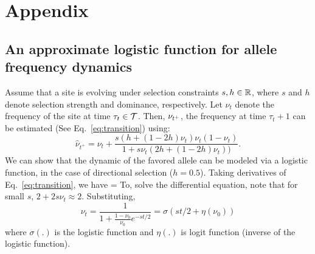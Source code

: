 
\clearpage
\setcounter{figure}{0}
\setcounter{table}{0}
\setcounter{equation}{0}
\renewcommand{\thefigure}{S\arabic{figure}}
\renewcommand{\thetable}{S\arabic{table}}
\renewcommand{\theequation}{S\arabic{equation}}

\section{Appendix}
\subsection{An approximate logistic function  for allele frequency dynamics} 
\label{app:af}
Assume that a site is evolving under selection constraints $s,h\in
{\mathbb R}$, where $s$ and $h$ denote selection strength and dominance,
respectively. Let $\nu_t$ denote the frequency of the site at time
$\tau_t\in {\cal T}$. Then, $\nu_{t^+}$, the frequency at time $\tau_t+1$
can be estimated (See Eq.~\ref{eq:transition}) using:
\[\hat{\nu}_{t^+}
=\nu_t+\frac{s(h+(1-2h)\nu_t)\nu_t(1-\nu_t)}{1+s\nu_t(2h+(1-2h)\nu_t))}.
  \label{eq:transition}
\]
We can show that the dynamic of the favored allele can be modeled
via a logistic function, in the case of directional selection
($h=0.5$). Taking derivatives of Eq.~\ref{eq:transition}, we have
\beq {} = 
\eeq To, solve the differential equation, note that for small $s$,
$2+2s\nu_t \approx 2$. Substituting,
\begin{equation}
\nu_t =\frac{1}{1+\frac{1-\nu_0}{\nu_0}e^{-st/2}} = \sigma(st/2+\eta(\nu_0)) 
\label{eq:inf-pop}
\end{equation}
where $\sigma(.)$ is the logistic function and $\eta(.)$ is logit function 
(inverse of the logistic function). 

